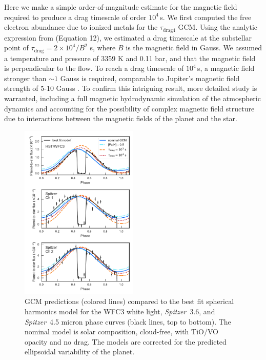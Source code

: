 \documentclass[twocolumn, trackchanges]{aastex61}
\newcommand{\project}[1]{\textsl{#1}}
\newcommand{\Spitzer}{\project{Spitzer}}
\begin{document}
Here we make a simple order-of-magnitude estimate for the magnetic field required to produce a drag timescale of order $10^4$\,s. We first computed the free electron abundance due to ionized metals for the $\tau_\mathrm{drag4}$ GCM. Using the analytic expression from \cite{perna10} (Equation 12), we estimated a drag timescale at the substellar point of $\tau_\mathrm{drag}  = 2\times10^4/B^2$ s, where $B$ is the magnetic field in Gauss. We assumed a temperature and pressure of 3359 K and 0.11 bar, %
and that the magnetic field is perpendicular to the flow. To reach a drag timescale of $10^4$\,s, a magnetic field stronger than $\sim1$ Gauss is required, comparable to Jupiter's magnetic field strength of 5-10 Gauss \citep{bagenal04}.  To confirm this intriguing result, more detailed study is warranted, including a full magnetic hydrodynamic simulation of the atmospheric dynamics \citep[e.g.][]{rogers17} and accounting for the possibility of complex magnetic field structure due to interactions between the magnetic fields of the planet and the star.

\begin{figure}
\includegraphics[width = 0.5\textwidth]{fig15.pdf}
\caption{GCM predictions (colored lines) compared to the best fit spherical harmonics model for the WFC3 white light, \Spitzer\ 3.6, and \Spitzer\ 4.5 micron phase curves (black lines, top to bottom). The nominal model is solar composition, cloud-free, with TiO/VO opacity and no drag. The models are corrected for the predicted ellipsoidal variability of the planet.}
\label{fig:gcmcomparison}
\end{figure}
\end{document}
